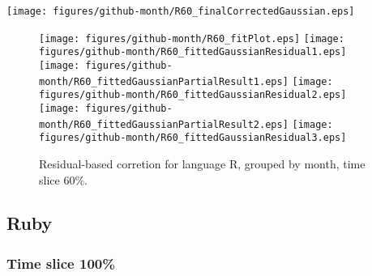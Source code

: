 \begin{center}
{\texttt{[image: figures/github-month/R60\_finalCorrectedGaussian.eps]}}
\end{center}

\FloatBarrier

\begin{figure}[t]
\centering
{}
{\texttt{[image: figures/github-month/R60\_fitPlot.eps]}}
{\texttt{[image: figures/github-month/R60\_fittedGaussianResidual1.eps]}}
{\texttt{[image: figures/github-month/R60\_fittedGaussianPartialResult1.eps]}}
{\texttt{[image: figures/github-month/R60\_fittedGaussianResidual2.eps]}}
{\texttt{[image: figures/github-month/R60\_fittedGaussianPartialResult2.eps]}}
{\texttt{[image: figures/github-month/R60\_fittedGaussianResidual3.eps]}}
\caption{Residual-based corretion for language R, grouped by month, time slice 60\%.}
\end{figure}


\FloatBarrier


\subsection{Ruby}

\subsubsection{Time slice 100\%}

